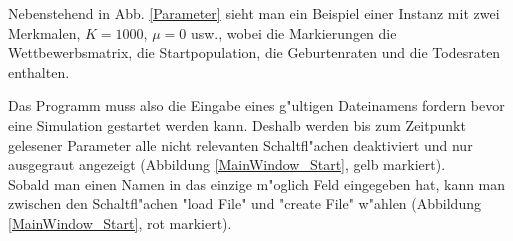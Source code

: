 \documentclass[11pt, a4paper, german]{article}
\theoremstyle{plain}
\begin{document}
\begin{center}
\begin{minipage}{0.6\textwidth}
		Nebenstehend in Abb. \ref{Parameter} sieht man ein Beispiel einer Instanz mit zwei Merkmalen, $ K = 1000 $, $ \mu = 0 $ usw., wobei die Markierungen die Wettbewerbsmatrix, die Startpopulation, die Geburtenraten und die Todesraten enthalten.\\
	\end{minipage}
	\end{center}
	
	Das Programm muss also die Eingabe eines g"ultigen Dateinamens fordern bevor eine Simulation gestartet werden kann. Deshalb werden bis zum Zeitpunkt gelesener Parameter alle nicht relevanten Schaltfl"achen deaktiviert und nur ausgegraut angezeigt (Abbildung \ref{MainWindow_Start}, gelb markiert).\\
	Sobald man einen Namen in das einzige m"oglich Feld eingegeben hat, kann man zwischen den Schaltfl"achen "{}load File"{} und "{}create File"{} w"ahlen (Abbildung \ref{MainWindow_Start}, rot markiert).\\
	
\end{document}
